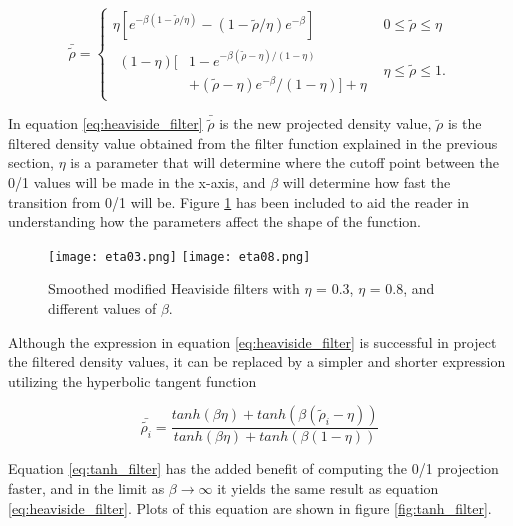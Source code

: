 \documentclass[../main.tex]{subfiles}
\begin{document}
\begin{equation}
  \bar{\tilde{\rho}} = \begin{cases}
    \eta [e^{-\beta (1 - \tilde{\rho} / \eta)} - (1 - \tilde{\rho} / \eta) e^{- \beta}] & 0 \leq \tilde{\rho} \leq \eta\\ 
  \begin{split}
    (1-\eta)[& 1 - e^{-\beta (\tilde{\rho} - \eta) / (1 - \eta)} \\ 
             & + (\tilde{\rho} - \eta) e^{- \beta} / (1 - \eta )] + \eta
  \end{split} & \eta \le \tilde{\rho} \leq 1.
\end{cases} 
  \label{eq:heaviside_filter}
\end{equation}

In equation \ref{eq:heaviside_filter} $\bar{\tilde{\rho}}$ is the new projected density value, $\tilde{\rho}$ is the filtered density value obtained from the filter function explained in the previous section, $\eta$ is a parameter that will determine where the cutoff point between the 0/1 values will be made in the x-axis, and $\beta$ will determine how fast the transition from 0/1 will be. Figure \ref{fig:heaviside_filter} has been included to aid the reader in understanding how the parameters affect the shape of the function.

\begin{figure}
  \texttt{[image: eta03.png]} \hfill
  \texttt{[image: eta08.png]} \hfill
  \caption{Smoothed modified Heaviside filters with $\eta$ = 0.3, $\eta$ = 0.8, and different values of $\beta$.}\label{fig:heaviside_filter}
\end{figure}

Although the expression in equation \ref{eq:heaviside_filter} is successful in project the filtered density values, it can be replaced by a simpler and shorter expression utilizing the hyperbolic tangent function \cite{wangProjectionMethodsConvergence2011a}

\begin{equation}
  \bar{\tilde{\rho_i}} = \frac{tanh(\beta \eta) + tanh(\beta(\tilde{\rho}_i - \eta))}{tanh(\beta \eta) + tanh(\beta (1 - \eta))} 
  \label{eq:tanh_filter}
\end{equation}

Equation \ref{eq:tanh_filter} has the added benefit of computing the 0/1 projection faster, and in the limit as $\beta \xrightarrow {} \infty$ it yields the same result as equation \ref{eq:heaviside_filter}. Plots of this equation are shown in figure \ref{fig:tanh_filter}.
\end{document}
